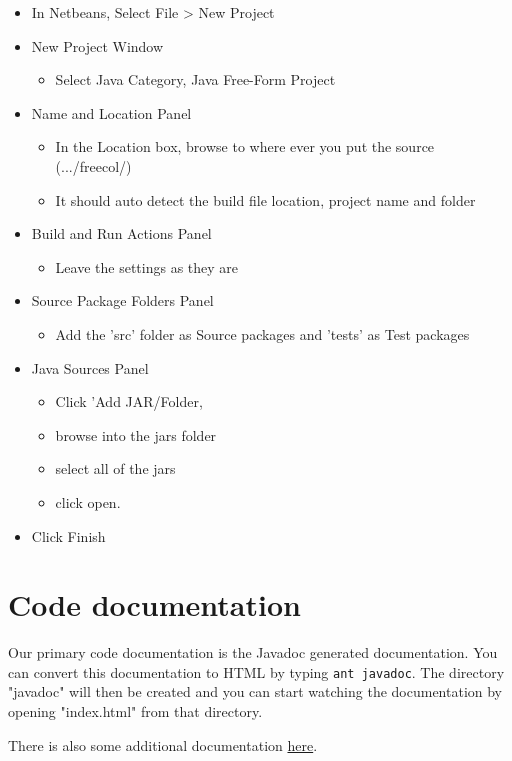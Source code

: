 \documentclass[12pt]{book}
\begin{document}
\begin{itemize}
\item In Netbeans, Select File > New Project
\item New Project Window
\begin{itemize}
\item Select Java Category, Java Free-Form Project
\end{itemize}
\item Name and Location Panel
\begin{itemize}
\item In the Location box, browse to where ever you put the source (.../freecol/)
\item It should auto detect the build file location, project name and folder
\end{itemize}
\item Build and Run Actions Panel
\begin{itemize}
\item Leave the settings as they are
\end{itemize}
\item Source Package Folders Panel
\begin{itemize}
\item Add the 'src' folder as Source packages and 'tests' as Test packages
\end{itemize}
\item Java Sources Panel
\begin{itemize}
\item Click 'Add JAR/Folder,
\item browse into the jars folder
\item select all of the jars
\item click open.
\end{itemize}
\item Click Finish
\end{itemize}

\hypertarget{Code documentation}{\section{Code documentation}}

Our primary code documentation is the Javadoc generated
documentation. You can convert this documentation to HTML by
typing \verb+ant javadoc+. The directory "javadoc" will then be
created and you can start watching the documentation by opening
"index.html" from that directory.

There is also some additional documentation
\href{http://www.freecol.org/index.php?section=3}{here}.
\end{document}
